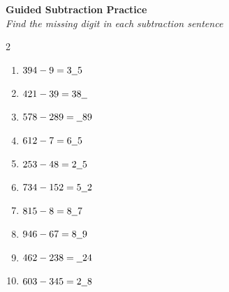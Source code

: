 \documentclass{article}
\begin{document}
\sffamily

\textbf{\Large Guided Subtraction Practice}\\[0.3em]
{\color{subtext}\textit{Find the missing digit in each subtraction sentence}}
\vspace{1.2em}

\begin{multicols}{2}
\begin{enumerate}[label=\arabic*., leftmargin=*, itemsep=0.9em]
  \Large

  \item $394 - 9 = 3\underline{\hspace{0.6em}}5$\\[0.6em]

  \item $421 - 39 = 38\underline{\hspace{0.6em}}$\\[0.6em]

  \item $578 - 289 = \underline{\hspace{0.6em}}89$\\[0.6em]

  \item $612 - 7 = 6\underline{\hspace{0.6em}}5$\\[0.6em]

  \item $253 - 48 = 2\underline{\hspace{0.6em}}5$\\[0.6em]

  \item $734 - 152 = 5\underline{\hspace{0.6em}}2$\\[0.6em]

  \item $815 - 8 = 8\underline{\hspace{0.6em}}7$\\[0.6em]

  \item $946 - 67 = 8\underline{\hspace{0.6em}}9$\\[0.6em]

  \item $462 - 238 = \underline{\hspace{0.6em}}24$\\[0.6em]

  \item $603 - 345 = 2\underline{\hspace{0.6em}}8$\\[0.6em]


\end{enumerate}
\end{multicols}
\end{document}
